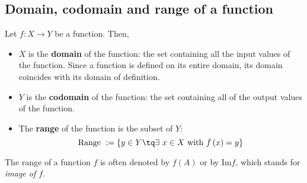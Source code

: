 \subsection{Domain, codomain and range of a function}
\begin{definition}
    Let $f:X\to Y$ be a function. Then, 
    \begin{itemize}
        \item $X$ is the \textbf{domain} of the function: the set containing all the input values of the function. Since a function is defined on its entire domain, its domain coincides with its domain of definition.
        \item $Y$ is the \textbf{codomain} of the function: the set containing all of the output values of the function.
        \item The \textbf{range} of the function is the subset of $Y$:
            \begin{equation}
                \textrm{Range }:=\{y\in Y\tq \exists\ x\in X \textrm{ with } f\left( x \right) = y\} 
            \end{equation}
    \end{itemize}

\end{definition}
\begin{notation}
    The range of a function $f$ is often denoted by $f\left( A \right) $ or by Im$f$, which stands for \textit{image of $f$}.
\end{notation}

